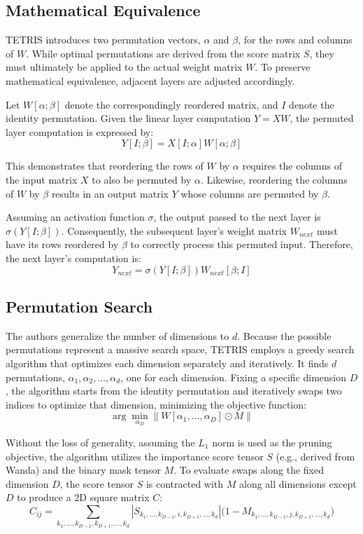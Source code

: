 \subsection*{Mathematical Equivalence}

TETRIS introduces two permutation vectors, $\alpha$ and $\beta$, for the rows and columns of $W$. While optimal permutations are derived from the score matrix $S$, they must ultimately be applied to the actual weight matrix $W$. To preserve mathematical equivalence, adjacent layers are adjusted accordingly.

Let $W[\alpha; \beta]$ denote the correspondingly reordered matrix, and $I$ denote the identity permutation. Given the linear layer computation $Y = XW$, the permuted layer computation is expressed by:
$$ Y[I; \beta] = X[I; \alpha] W[\alpha; \beta] $$

This demonstrates that reordering the rows of $W$ by $\alpha$ requires the columns of the input matrix $X$ to also be permuted by $\alpha$. Likewise, reordering the columns of $W$ by $\beta$ results in an output matrix $Y$ whose columns are permuted by $\beta$.

Assuming an activation function $\sigma$, the output passed to the next layer is $\sigma(Y[I; \beta])$. Consequently, the subsequent layer's weight matrix $W_{next}$ must have its rows reordered by $\beta$ to correctly process this permuted input. Therefore, the next layer's computation is:
$$ Y_{next} = \sigma(Y[I; \beta]) W_{next}[\beta; I] $$

\subsection*{Permutation Search}

The authors generalize the number of dimensions to $d$. Because the possible permutations represent a massive search space, TETRIS employs a greedy search algorithm that optimizes each dimension separately and iteratively. It finds $d$ permutations, $\alpha_{1}, \alpha_{2}, \ldots, \alpha_{d}$, one for each dimension. Fixing a specific dimension $D$, the algorithm starts from the identity permutation and iteratively swaps two indices to optimize that dimension, minimizing the objective function:
$$ \arg\min_{\alpha_D} \|W[\alpha_{1}, \dots, \alpha_{D}] \odot M \| $$

Without the loss of generality, assuming the $L_1$ norm is used as the pruning objective, the algorithm utilizes the importance score tensor $S$ (e.g., derived from Wanda) and the binary mask tensor $M$. To evaluate swaps along the fixed dimension $D$, the score tensor $S$ is contracted with $M$ along all dimensions except $D$ to produce a 2D square matrix $C$:
$$ C_{ij} = \sum_{k_1,\dots,k_{D-1},k_{D+1},\dots,k_d} |S_{k_1,\dots,k_{D-1},i,k_{D+1},\dots,k_d} | \bigl(1 - M_{k_1,\dots,k_{D-1},j,k_{D+1},\dots,k_d}\bigr) $$

